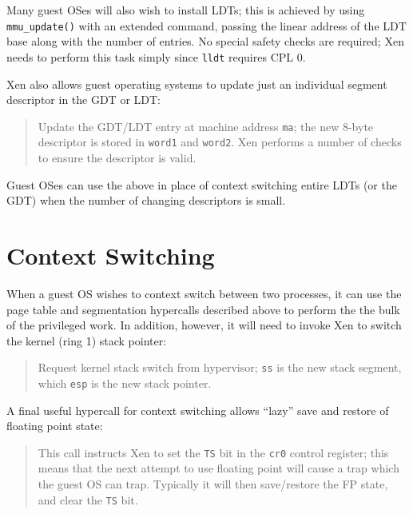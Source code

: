 \documentclass[11pt,twoside,final,openright]{xenstyle}
\begin{document}
Many guest OSes will also wish to install LDTs; this is achieved by
using {\tt mmu\_update()} with an extended command, passing the
linear address of the LDT base along with the number of entries. No
special safety checks are required; Xen needs to perform this task
simply since {\tt lldt} requires CPL 0.


Xen also allows guest operating systems to update just an 
individual segment descriptor in the GDT or LDT:  

\begin{quote}

Update the GDT/LDT entry at machine address {\tt ma}; the new
8-byte descriptor is stored in {\tt word1} and {\tt word2}.
Xen performs a number of checks to ensure the descriptor is 
valid. 

\end{quote}

Guest OSes can use the above in place of context switching entire 
LDTs (or the GDT) when the number of changing descriptors is small. 

\section{Context Switching} 

When a guest OS wishes to context switch between two processes, 
it can use the page table and segmentation hypercalls described
above to perform the the bulk of the privileged work. In addition, 
however, it will need to invoke Xen to switch the kernel (ring 1) 
stack pointer: 

\begin{quote} 

Request kernel stack switch from hypervisor; {\tt ss} is the new 
stack segment, which {\tt esp} is the new stack pointer. 

\end{quote} 

A final useful hypercall for context switching allows ``lazy'' 
save and restore of floating point state: 

\begin{quote}

This call instructs Xen to set the {\tt TS} bit in the {\tt cr0}
control register; this means that the next attempt to use floating
point will cause a trap which the guest OS can trap. Typically it will
then save/restore the FP state, and clear the {\tt TS} bit. 
\end{quote} 
\end{document}

